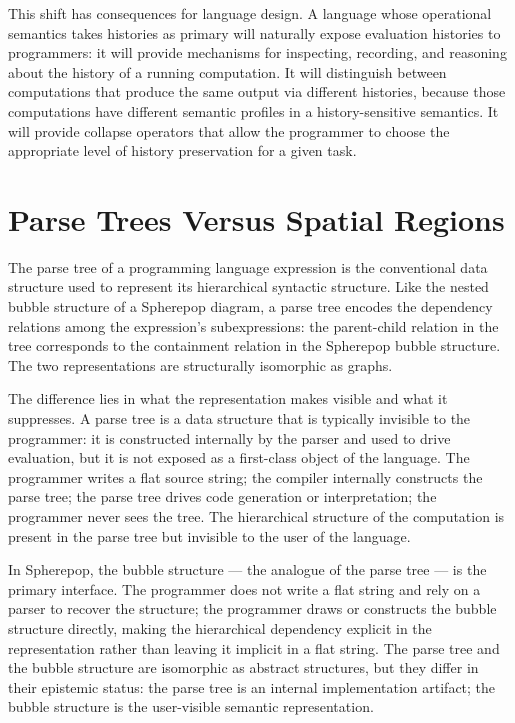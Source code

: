 \documentclass[12pt,openany]{book}
\theoremstyle{plain}
\theoremstyle{definition}
\theoremstyle{remark}
\begin{document}
This shift has consequences for language design. A language whose operational semantics takes histories as primary will naturally expose evaluation histories to programmers: it will provide mechanisms for inspecting, recording, and reasoning about the history of a running computation. It will distinguish between computations that produce the same output via different histories, because those computations have different semantic profiles in a history-sensitive semantics. It will provide collapse operators that allow the programmer to choose the appropriate level of history preservation for a given task.

\section{Parse Trees Versus Spatial Regions}

The parse tree of a programming language expression is the conventional data structure used to represent its hierarchical syntactic structure. Like the nested bubble structure of a Spherepop diagram, a parse tree encodes the dependency relations among the expression's subexpressions: the parent-child relation in the tree corresponds to the containment relation in the Spherepop bubble structure. The two representations are structurally isomorphic as graphs.

The difference lies in what the representation makes visible and what it suppresses. A parse tree is a data structure that is typically invisible to the programmer: it is constructed internally by the parser and used to drive evaluation, but it is not exposed as a first-class object of the language. The programmer writes a flat source string; the compiler internally constructs the parse tree; the parse tree drives code generation or interpretation; the programmer never sees the tree. The hierarchical structure of the computation is present in the parse tree but invisible to the user of the language.

In Spherepop, the bubble structure — the analogue of the parse tree — is the primary interface. The programmer does not write a flat string and rely on a parser to recover the structure; the programmer draws or constructs the bubble structure directly, making the hierarchical dependency explicit in the representation rather than leaving it implicit in a flat string. The parse tree and the bubble structure are isomorphic as abstract structures, but they differ in their epistemic status: the parse tree is an internal implementation artifact; the bubble structure is the user-visible semantic representation.
\end{document}

